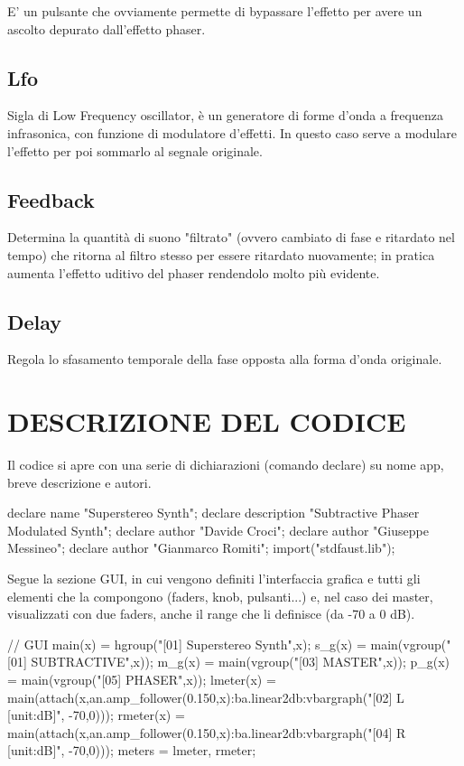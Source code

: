 \documentclass[
	a4paper,
	twocolumn
	]{article}
\begin{document}
E' un pulsante che ovviamente permette di bypassare l'effetto per avere un
ascolto depurato dall'effetto phaser.

\subsection*{Lfo}

Sigla di Low Frequency oscillator, è un generatore di forme d'onda a frequenza
infrasonica, con funzione di modulatore d'effetti. In questo caso serve a
modulare l'effetto per poi sommarlo al segnale originale.

\subsection*{Feedback}

Determina la quantità di suono "filtrato" (ovvero cambiato di fase e
ritardato nel tempo) che ritorna al filtro stesso per essere ritardato
nuovamente; in pratica aumenta l'effetto uditivo del phaser rendendolo
molto più evidente.

\subsection*{Delay}

Regola lo sfasamento temporale della fase opposta alla forma d'onda originale.


\section*{DESCRIZIONE DEL CODICE}

Il codice si apre con una serie di dichiarazioni (comando declare) su nome app,
breve descrizione e autori.

declare name "Superstereo Synth";
declare description "Subtractive Phaser Modulated Synth";
declare author "Davide Croci";
declare author "Giuseppe Messineo";
declare author "Gianmarco Romiti";
import("stdfaust.lib");


Segue la sezione GUI, in cui vengono definiti l'interfaccia grafica e tutti gli
elementi che la compongono (faders, knob, pulsanti...) e, nel caso dei master,
visualizzati con due faders, anche il range che li definisce (da -70 a 0 dB).

// GUI
main(x) = hgroup("[01] Superstereo Synth",x);
s_g(x) = main(vgroup("[01] SUBTRACTIVE",x));
m_g(x) = main(vgroup("[03] MASTER",x));
p_g(x) = main(vgroup("[05] PHASER",x));
lmeter(x) = main(attach(x,an.amp_follower(0.150,x):ba.linear2db:vbargraph("[02]
			L [unit:dB]", -70,0)));
rmeter(x) = main(attach(x,an.amp_follower(0.150,x):ba.linear2db:vbargraph("[04]
			R [unit:dB]", -70,0)));
meters = lmeter, rmeter;
\end{document}
